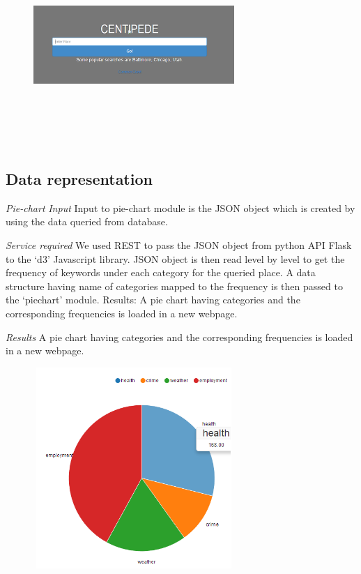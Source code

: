 \documentclass[conference]{IEEEtran}
\begin{document}
\begin{figure}[h]
\includegraphics[height=3in, width=3in]{1.png}
\label{1}
\end{figure}

\subsection{Data representation}

\textit{Pie-chart}
\textit{Input} Input to pie-chart module is the JSON object which is created by using the data queried from database. 

\textit{Service required} We used REST to pass the JSON object from python API Flask to the ‘d3’ Javascript library. JSON object is then read level by level to get the frequency of keywords under each category for the queried place. A data structure having name of categories mapped to the frequency is then passed to the ‘piechart’ module.
Results: A pie chart having categories and the corresponding frequencies is loaded in a new webpage.

\textit{Results} A pie chart having categories and the corresponding frequencies is loaded in a new webpage.

\begin{figure}[h]
\includegraphics[height=3in, width=3in]{2.png}
\label{2}
\end{figure}
\end{document}
